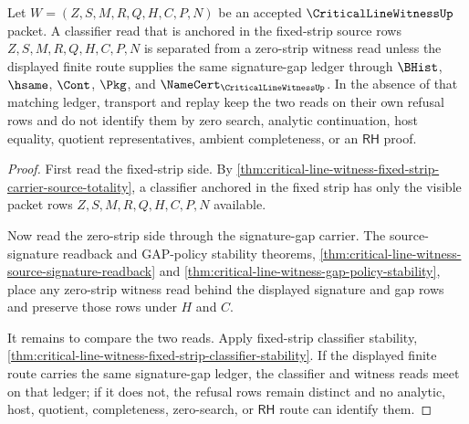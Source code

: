\begin{theorem}
\label{thm:critical-line-witness-fixed-strip-classifier-separation}
Let $W=(Z,S,M,R,Q,H,C,P,N)$ be an accepted $\CriticalLineWitnessUp$ packet. A classifier read that is anchored in the fixed-strip source rows $Z,S,M,R,Q,H,C,P,N$ is separated from a zero-strip witness read unless the displayed finite route supplies the same signature-gap ledger through $\BHist$, $\hsame$, $\Cont$, $\Pkg$, and $\NameCert_{\CriticalLineWitnessUp}$. In the absence of that matching ledger, transport and replay keep the two reads on their own refusal rows and do not identify them by zero search, analytic continuation, host equality, quotient representatives, ambient completeness, or an $\mathsf{RH}$ proof.
\end{theorem}
\begin{proof}
First read the fixed-strip side. By \autoref{thm:critical-line-witness-fixed-strip-carrier-source-totality}, a classifier anchored in the fixed strip has only the visible packet rows $Z,S,M,R,Q,H,C,P,N$ available.

Now read the zero-strip side through the signature-gap carrier. The source-signature readback and GAP-policy stability theorems, \autoref{thm:critical-line-witness-source-signature-readback} and \autoref{thm:critical-line-witness-gap-policy-stability}, place any zero-strip witness read behind the displayed signature and gap rows and preserve those rows under $H$ and $C$.

It remains to compare the two reads. Apply fixed-strip classifier stability, \autoref{thm:critical-line-witness-fixed-strip-classifier-stability}. If the displayed finite route carries the same signature-gap ledger, the classifier and witness reads meet on that ledger; if it does not, the refusal rows remain distinct and no analytic, host, quotient, completeness, zero-search, or $\mathsf{RH}$ route can identify them.
\end{proof}

